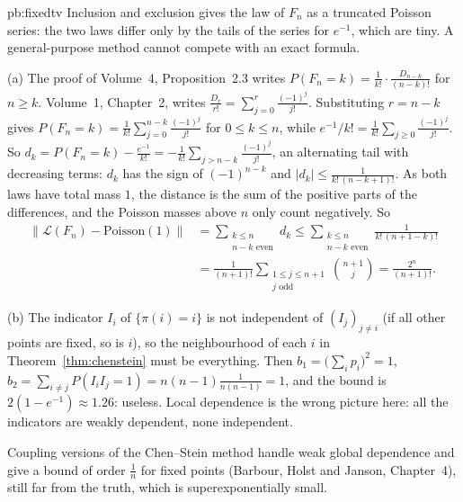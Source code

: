 \begin{solution}{pb:fixedtv}
\idea Inclusion and exclusion gives the law of $F_n$ as a truncated Poisson series: the two laws differ only by the tails of the series for $e^{-1}$, which are tiny. A
general-purpose method cannot compete with an exact formula.

\writeup (a) The proof of Volume~4, Proposition~2.3 writes $P(F_n=k)=\frac1{k!}\cdot\frac{D_{n-k}}{(n-k)!}$ for $n\ge k$. Volume~1, Chapter~2, writes $\frac{D_r}{r!}=\sum_{j=0}^r\frac{(-1)^j}{j!}$. Substituting $r=n-k$ gives
$P(F_n=k)=\frac1{k!}\sum_{j=0}^{n-k}\frac{(-1)^j}{j!}$ for $0\le k\le n$, while $e^{-1}/k!=\frac1{k!}\sum_{j\ge0}\frac{(-1)^j}{j!}$.
So $d_k=P(F_n=k)-\frac{e^{-1}}{k!}=-\frac1{k!}\sum_{j>n-k}\frac{(-1)^j}{j!}$, an alternating tail with decreasing terms: $d_k$ has the sign of $(-1)^{n-k}$ and
$|d_k|\le\frac1{k!\,(n-k+1)!}$. As both laws have total mass $1$, the distance is the sum of the positive parts of the differences, and the Poisson masses above $n$ only
count negatively. So
\[
\begin{aligned}
\|\mathcal L(F_n)-\text{Poisson}(1)\|&=\sum_{\substack{k\le n\\ n-k\text{ even}}}d_k\le\sum_{\substack{k\le n\\ n-k\text{ even}}}\frac1{k!\,(n+1-k)!}\\
&=\frac1{(n+1)!}\sum_{\substack{1\le j\le n+1\\ j\text{ odd}}}\binom{n+1}j=\frac{2^n}{(n+1)!}.
\end{aligned}
\]

(b) The indicator $I_i$ of $\{\pi(i)=i\}$ is not independent of $(I_j)_{j\ne i}$ (if all other points are fixed, so is $i$), so the neighbourhood of each $i$ in
Theorem~\ref{thm:chenstein} must be everything. Then $b_1=\bigl(\sum_ip_i\bigr)^2=1$, $b_2=\sum_{i\ne j}P(I_iI_j=1)=n(n-1)\frac1{n(n-1)}=1$, and the bound is $2(1-e^{-1})\approx1.26$:
useless. Local dependence is the wrong picture here: all the indicators are weakly dependent, none independent.

\leads Coupling versions of the Chen--Stein method handle weak global dependence and give a bound of order $\frac1n$ for fixed points (Barbour, Holst and
Janson, Chapter~4), still far from the truth, which is superexponentially small.
\end{solution}

